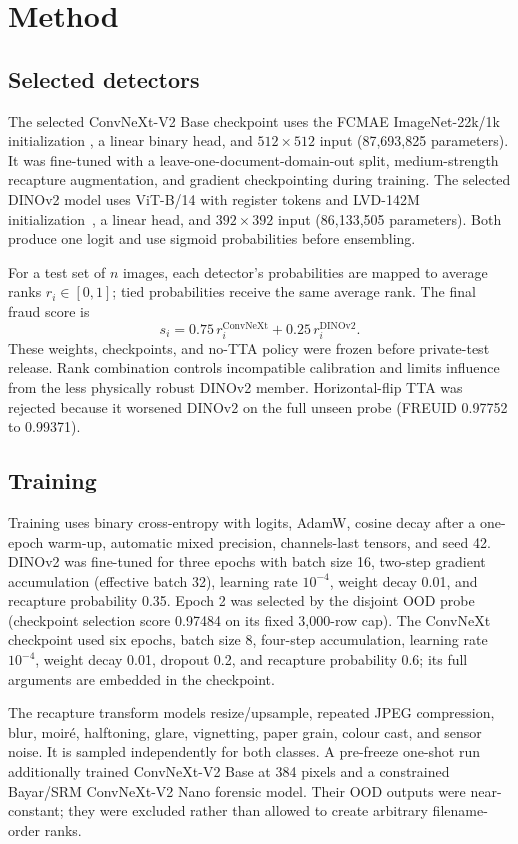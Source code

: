 \documentclass[10pt,a4paper]{article}
\begin{document}
\section{Method}
\subsection{Selected detectors}
The selected ConvNeXt-V2 Base checkpoint uses the FCMAE ImageNet-22k/1k initialization
\cite{convnextv2}, a linear binary head, and $512\times512$ input (87,693,825 parameters). It was
fine-tuned with a leave-one-document-domain-out split, medium-strength recapture augmentation, and
gradient checkpointing during training. The selected DINOv2 model uses ViT-B/14 with
register tokens and LVD-142M initialization~\cite{dinov2}, a linear head, and $392\times392$ input
(86,133,505 parameters). Both produce one logit and use sigmoid probabilities before ensembling.

For a test set of $n$ images, each detector's probabilities are mapped to average ranks
$r_i\in[0,1]$; tied probabilities receive the same average rank. The final fraud score is
\begin{equation}
  s_i = 0.75\,r_i^{\mathrm{ConvNeXt}} + 0.25\,r_i^{\mathrm{DINOv2}}.
\end{equation}
These weights, checkpoints, and no-TTA policy were frozen before private-test release. Rank
combination controls incompatible calibration and limits influence from the less physically robust
DINOv2 member. Horizontal-flip TTA was rejected because it worsened DINOv2 on the full unseen probe
(FREUID 0.97752 to 0.99371).

\subsection{Training}
Training uses binary cross-entropy with logits, AdamW, cosine decay after a one-epoch warm-up,
automatic mixed precision, channels-last tensors, and seed 42. DINOv2 was fine-tuned for three
epochs with batch size 16, two-step gradient accumulation (effective batch 32), learning rate
$10^{-4}$, weight decay 0.01, and recapture probability 0.35. Epoch 2 was selected by the disjoint
OOD probe (checkpoint selection score 0.97484 on its fixed 3,000-row cap). The ConvNeXt checkpoint
used six epochs, batch size 8, four-step accumulation, learning rate $10^{-4}$, weight decay 0.01,
dropout 0.2, and recapture probability 0.6; its full arguments are embedded in the checkpoint.

The recapture transform models resize/upsample, repeated JPEG compression, blur, moir\'e,
halftoning, glare, vignetting, paper grain, colour cast, and sensor noise. It is sampled independently
for both classes. A pre-freeze one-shot run additionally trained ConvNeXt-V2 Base at 384 pixels and
a constrained Bayar/SRM ConvNeXt-V2 Nano forensic model. Their OOD outputs were near-constant; they
were excluded rather than allowed to create arbitrary filename-order ranks.
\end{document}
